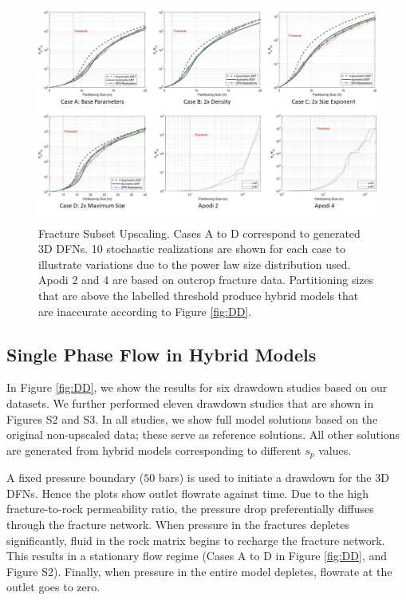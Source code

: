 \documentclass[draft]{agujournal2018}
\begin{document}
\begin{figure}[h]
 \centering

 \includegraphics[width=\textwidth]{FSU/FSU_main.jpg}

 \caption{Fracture Subset Upscaling. Cases A to D correspond to generated 3D DFNs. 10 stochastic realizations are shown for each case to illustrate variations due to the power law size distribution used. Apodi 2 and 4 are based on outcrop fracture data. Partitioning sizes that are above the labelled threshold produce hybrid models that are inaccurate according to Figure \ref{fig:DD}.}
 \label{fig:FSU}
\end{figure}

\subsection{Single Phase Flow in Hybrid Models}
In Figure \ref{fig:DD}, we show the results for six drawdown studies based on our datasets. We further performed eleven drawdown studies that are shown in Figures S2 and S3. In all studies, we show full model solutions based on the original non-upscaled data; these serve as reference solutions. All other solutions are generated from hybrid models corresponding to different $s_p$ values. 

A fixed pressure boundary ($50$ bars) is used to initiate a drawdown for the 3D DFNs. Hence the plots show outlet flowrate against time. Due to the high fracture-to-rock permeability ratio, the pressure drop preferentially diffuses through the fracture network. When pressure in the fractures depletes significantly, fluid in the rock matrix begins to recharge the fracture network. This results in a stationary flow regime (Cases A to D in Figure \ref{fig:DD}, and Figure S2). Finally, when pressure in the entire model depletes, flowrate at the outlet goes to zero.
\end{document}
